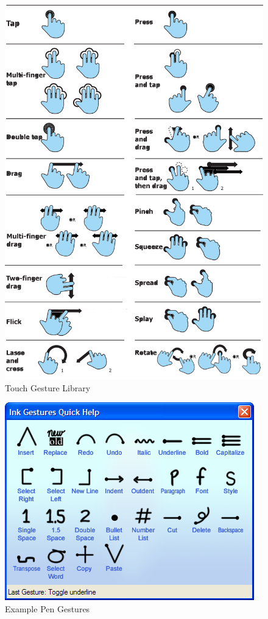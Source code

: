 \documentclass[12pt]{report}
\begin{document}
\begin{figure}
\includegraphics[width=0.9\linewidth]{GestureLibrary}
\caption{Touch Gesture Library}
\end{figure}
\begin{figure}
\includegraphics[width=0.9\linewidth]{pengestures}
\caption{Example Pen Gestures}
\end{figure}
\end{document}

